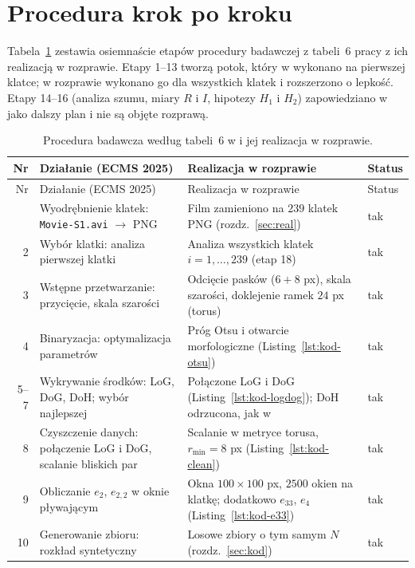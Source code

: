 \documentclass[12pt,a4paper,twoside,openright]{report}
\theoremstyle{definition}
\theoremstyle{remark}
\begin{document}
{\section{Procedura krok po kroku}
Tabela~\ref{tab:workflow} zestawia osiemnaście etapów procedury badawczej z tabeli~6 pracy \cite{ligocki2025study} z ich realizacją w rozprawie. Etapy 1--13 tworzą potok, który w \cite{ligocki2025study} wykonano na pierwszej klatce; w rozprawie wykonano go dla wszystkich klatek i rozszerzono o lepkość. Etapy 14--16 (analiza szumu, miary $R$ i $I$, hipotezy $H_1$ i $H_2$) zapowiedziano w \cite{ligocki2025study} jako dalszy plan i nie są objęte rozprawą.
{\small\renewcommand{\arraystretch}{1.15}
\begin{longtable}{@{}r >{\raggedright\arraybackslash}p{3.6cm} >{\raggedright\arraybackslash}p{6.3cm} l@{}}
\caption{Procedura badawcza według tabeli~6 w \cite{ligocki2025study} i jej realizacja w rozprawie.}\label{tab:workflow}\\
\toprule
Nr & Działanie (ECMS 2025) & Realizacja w rozprawie & Status\\
\midrule
\endfirsthead
\toprule
Nr & Działanie (ECMS 2025) & Realizacja w rozprawie & Status\\
\midrule
\endhead
\bottomrule
\endfoot
1 & Wyodrębnienie klatek: \texttt{Movie-S1.avi} $\to$ PNG & Film zamieniono na $239$ klatek PNG (rozdz.~\ref{sec:real}) & tak\\
2 & Wybór klatki: analiza pierwszej klatki & Analiza wszystkich klatek $i=1,\dots,239$ (etap 18) & tak\\
3 & Wstępne przetwarzanie: przycięcie, skala szarości & Odcięcie pasków ($6+8$ px), skala szarości, doklejenie ramek $24$ px (torus) & tak\\
4 & Binaryzacja: optymalizacja parametrów & Próg Otsu i otwarcie morfologiczne (Listing~\ref{lst:kod-otsu}) & tak\\
5--7 & Wykrywanie środków: LoG, DoG, DoH; wybór najlepszej & Połączone LoG i DoG (Listing~\ref{lst:kod-logdog}); DoH odrzucona, jak w \cite{ligocki2025study} & tak\\
8 & Czyszczenie danych: połączenie LoG i DoG, scalanie bliskich par & Scalanie w metryce torusa, $r_{\min}=8$ px (Listing~\ref{lst:kod-clean}) & tak\\
9 & Obliczanie $e_2$, $e_{2,2}$ w oknie pływającym & Okna $100\times100$ px, $2500$ okien na klatkę; dodatkowo $e_{33}$, $e_4$ (Listing~\ref{lst:kod-e33}) & tak\\
10 & Generowanie zbioru: rozkład syntetyczny & Losowe zbiory o tym samym $N$ (rozdz.~\ref{sec:kod}) & tak\\

\end{longtable}}}
\end{document}

